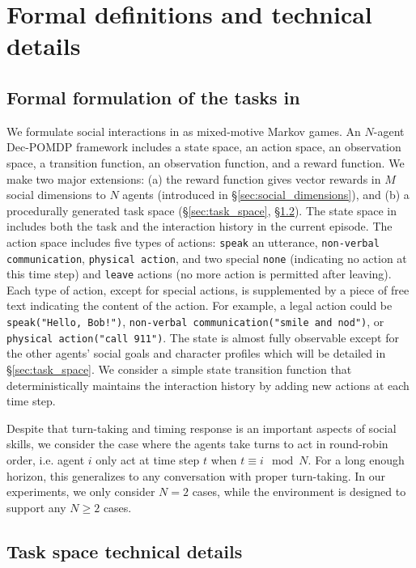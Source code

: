 \section{Formal definitions and technical details}
\label{app:formal_formulation}
\subsection{Formal formulation of the tasks in \sotopia}
We formulate social interactions in \sotopia as mixed-motive Markov games. An $N$-agent Dec-POMDP framework \cite{bernstein2002complexity,nair2003taming} includes a state space, an action space, an observation space, a transition function, an observation function, and a reward function. We make two major extensions: (a) the reward function gives vector rewards in $M$ social dimensions to $N$ agents (introduced in \S\ref{sec:social_dimensions}), and (b) a procedurally generated task space (\S\ref{sec:task_space}, \S\ref{app:sec:task_space}). The state space in \sotopia includes both the task and the interaction history in the current episode. The action space includes five types of actions: \texttt{speak} an utterance, \texttt{non-verbal communication}, \texttt{physical action}, and two special \texttt{none} (indicating no action at this time step) and \texttt{leave} actions (no more action is permitted after leaving). Each type of action, except for special actions, is supplemented by a piece of free text indicating the content of the action. For example, a legal action could be \texttt{speak("Hello, Bob!")}, \texttt{non-verbal communication("smile and nod")}, or \texttt{physical action("call 911")}. The state is almost fully observable except for the other agents' social goals and character profiles which will be detailed in \S\ref{sec:task_space}. We consider a simple state transition function that deterministically maintains the interaction history by adding new actions at each time step. 

Despite that turn-taking and timing response is an important aspects of social skills, we consider the case where the agents take turns to act in round-robin order, i.e. agent $i$ only act at time step $t$ when $t \equiv i \mod N$. For a long enough horizon, this generalizes to any conversation with proper turn-taking. In our experiments, we only consider $N=2$ cases, while the environment is designed to support any $N\geq2$ cases.

\subsection{Task space technical details}
\label{app:sec:task_space}
